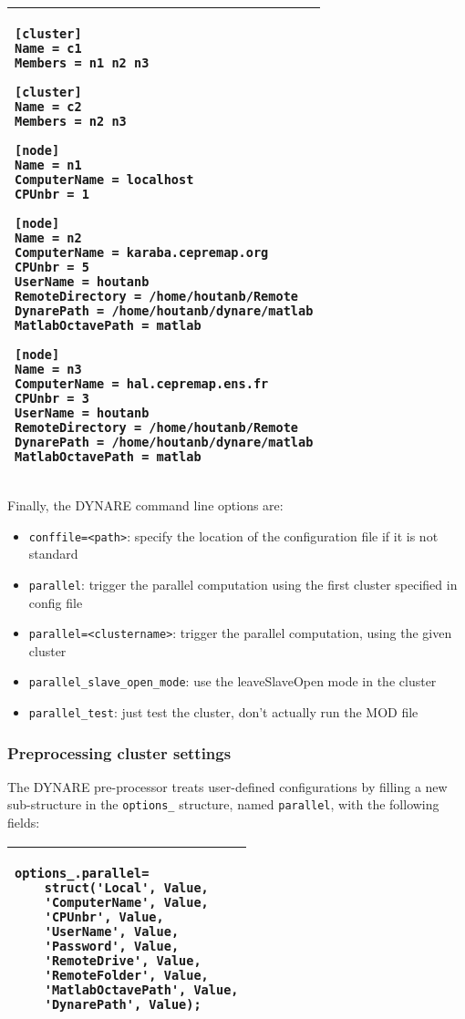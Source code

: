 \documentclass[12pt,a4paper,pdftex]{article}
\begin{document}
\singlespacing
{\footnotesize
\hspace{2cm}\begin{tabular}[b]{| p{8cm} |}
  \hline
\begin{verbatim}
[cluster]
Name = c1
Members = n1 n2 n3

[cluster]
Name = c2
Members = n2 n3

[node]
Name = n1
ComputerName = localhost
CPUnbr = 1

[node]
Name = n2
ComputerName = karaba.cepremap.org
CPUnbr = 5
UserName = houtanb
RemoteDirectory = /home/houtanb/Remote
DynarePath = /home/houtanb/dynare/matlab
MatlabOctavePath = matlab

[node]
Name = n3
ComputerName = hal.cepremap.ens.fr
CPUnbr = 3
UserName = houtanb
RemoteDirectory = /home/houtanb/Remote
DynarePath = /home/houtanb/dynare/matlab
MatlabOctavePath = matlab
 \end{verbatim}
\\ \hline
\end{tabular}
}
\doublespacing

Finally, the DYNARE command line options are:
 \begin{itemize}
  \item \verb"conffile=<path>": specify the location of the configuration file if it is not standard
  \item \verb"parallel": trigger the parallel computation using the first cluster specified in config file
  \item \verb"parallel=<clustername>": trigger the parallel computation, using the given cluster
  \item \verb"parallel_slave_open_mode": use the leaveSlaveOpen mode in the cluster
  \item \verb"parallel_test": just test the cluster, don't actually run the MOD file

 \end{itemize}



\subsubsection{Preprocessing cluster settings}
The DYNARE pre-processor treats user-defined configurations by filling a new sub-structure in the \verb"options_" structure, named \verb"parallel", with the following fields:

\singlespacing
{\footnotesize
\hspace{3cm}\begin{tabular}[b]{| p{7cm} |}
  \hline
\begin{verbatim}
options_.parallel=
    struct('Local', Value,
    'ComputerName', Value,
    'CPUnbr', Value,
    'UserName', Value,
    'Password', Value,
    'RemoteDrive', Value,
    'RemoteFolder', Value,
    'MatlabOctavePath', Value,
    'DynarePath', Value);
\end{verbatim}
\\ \hline
\end{tabular}
}
\doublespacing
\end{document}
